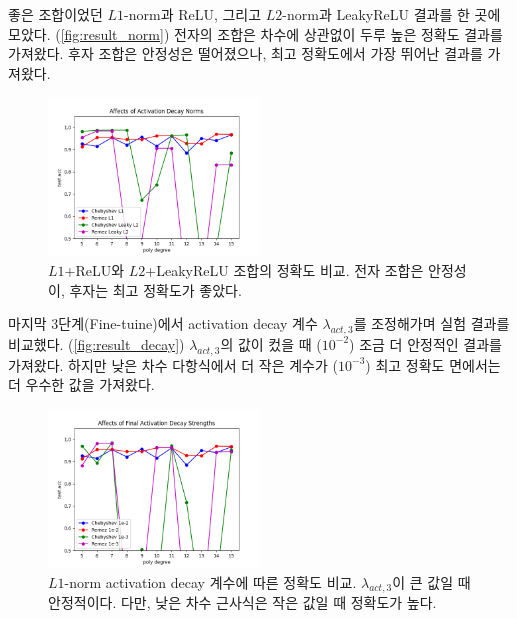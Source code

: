 \documentclass[a4paper, 11pt, chapterprefix=false]{report}
\begin{document}
좋은 조합이었던 $L1$-norm과 ReLU, 그리고 $L2$-norm과 LeakyReLU 결과를 한 곳에
모았다. (\autoref{fig:result_norm}) 전자의 조합은 차수에 상관없이 두루 높은
정확도 결과를 가져왔다. 후자 조합은 안정성은 떨어졌으나, 최고 정확도에서 가장
뛰어난 결과를 가져왔다.
\begin{figure}[htbp]
  \centering
  \includegraphics[width=0.5\textwidth]{resource/norm.png}
  \caption{$L1$+ReLU와 $L2$+LeakyReLU 조합의 정확도 비교. 전자 조합은 안정성이, 후자는 최고 정확도가 좋았다.}
  \label{fig:result_norm}
\end{figure}

마지막 3단계(Fine-tuine)에서 activation decay 계수 $\lambda_{act, 3}$를
조정해가며 실험 결과를 비교했다. (\autoref{fig:result_decay}) $\lambda_{act,
3}$의 값이 컸을 때 ($10^{-2}$) 조금 더 안정적인 결과를 가져왔다. 하지만 낮은
차수 다항식에서 더 작은 계수가 ($10^{-3}$) 최고 정확도 면에서는 더 우수한 값을
가져왔다.
\begin{figure}[htbp]
  \centering
  \includegraphics[width=0.5\textwidth]{resource/decay.png}
  \caption{$L1$-norm activation decay 계수에 따른 정확도 비교. $\lambda_{act,3}$이 큰 값일 때 안정적이다. 다만, 낮은 차수 근사식은 작은 값일 때 정확도가 높다.}
  \label{fig:result_decay}
\end{figure}
\end{document}
